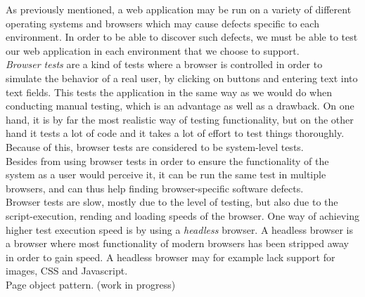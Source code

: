 As previously mentioned, a web application may be run on a variety of
different operating systems and browsers which may cause defects
specific to each environment. In order to be able to discover such
defects, we must be able to test our web application in each environment
that we choose to support.\\

\emph{Browser tests} are a kind of tests where a browser is controlled
in order to simulate the behavior of a real user, by clicking on buttons
and entering text into text fields. This tests the application in the
same way as we would do when conducting manual testing, which is an
advantage as well as a drawback. On one hand, it is by far the most
realistic way of testing functionality, but on the other hand it tests a
lot of code and it takes a lot of effort to test things thoroughly.
Because of this, browser tests are considered to be system-level
tests.\\

Besides from using browser tests in order to ensure the functionality of
the system as a user would perceive it, it can be run the same test in
multiple browsers, and can thus help finding browser-specific software
defects.\\

Browser tests are slow, mostly due to the level of testing, but also due
to the script-execution, rending and loading speeds of the browser. One
way of achieving higher test execution speed is by using a
\emph{headless} browser. A headless browser is a browser where most
functionality of modern browsers has been stripped away in order to gain
speed. A headless browser may for example lack support for images, CSS
and Javascript.\\

Page object pattern. (work in progress) \cite{web:page_object}
